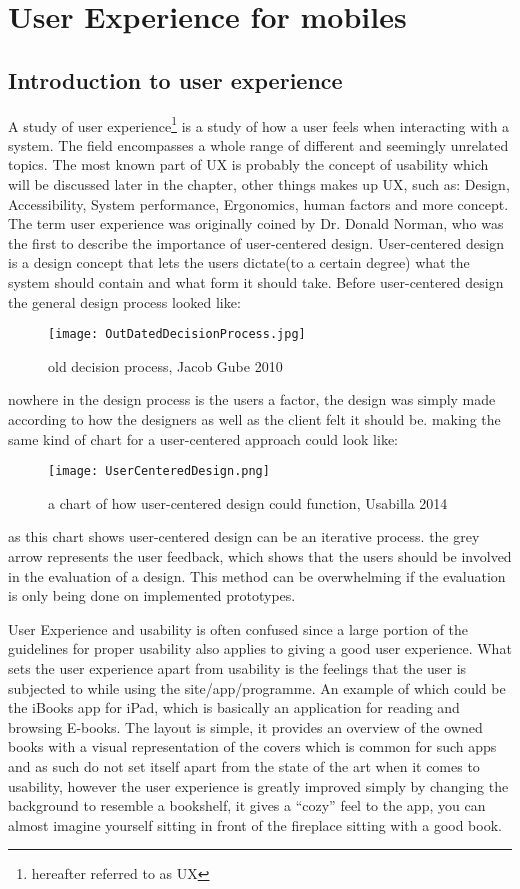 \section{User Experience for mobiles}
\subsection{Introduction to user experience }
A study of user experience\footnote{hereafter referred to as UX} is a study of how a user feels when interacting with a system. The field encompasses a whole range of different and seemingly unrelated topics. The most known part of UX is probably the concept of usability which will be discussed later in the chapter, other things makes up UX, such as: Design, Accessibility, System performance, Ergonomics, human factors and more concept. The term user experience  was originally coined by Dr. Donald Norman, who was the first to describe the importance of user-centered design. User-centered design is a design concept that lets the users dictate(to a certain degree) what the system should contain and what form it should take.
Before user-centered design the general design process looked like:
\begin{figure}[H]
\centering
\texttt{[image: OutDatedDecisionProcess.jpg]}
\caption{old decision process, Jacob Gube 2010}
\end{figure}
nowhere in the design process is the users a factor, the design was simply made according to how the designers as well as the client felt it should be. making the same kind of chart for a user-centered approach could look like:\\
\begin{figure}[H]
\centering
\texttt{[image: UserCenteredDesign.png]}
\caption{a chart of how user-centered design could function, Usabilla 2014}
\end{figure}
as this chart shows user-centered design can be an iterative process. the grey arrow represents the user feedback, which shows that the users should be involved in the evaluation of a design. This method can be overwhelming if the evaluation is only being done on implemented prototypes.

User Experience and usability is often confused since a large portion of the guidelines for proper usability also applies to giving a good user experience. What sets the user experience apart from usability is the feelings that the user is subjected to while using the site/app/programme.
An example of which could be the iBooks app for iPad, which is basically an application for reading and browsing E-books. The layout is simple,  it provides an overview of the owned books with a visual representation of the covers which is common for such apps and as such do not set itself apart from the state of the art when it comes to usability, however the user experience is greatly improved simply by changing the background to resemble a bookshelf, it gives a “cozy” feel to the app, you can almost imagine yourself sitting in front of the fireplace sitting with a good book.

